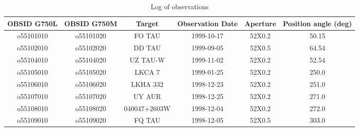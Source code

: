\begin{table*}
\caption{Log of observations\label{tab:obs}}
\begin{center}
\begin{tabular}{cccccc}
\hline\hline
OBSID G750L & OBSID G750M & Target & Observation Date & Aperture & Position angle (deg) \\
\hline
o55101010& o55101020 & FO TAU & 1999-10-17 & 52X0.2 & 50.15 \\


o55102010& o55102020 & DD TAU & 1999-09-05 & 52X0.5 & 64.54 \\


o55104010& o55104020 & UZ TAU-W & 1999-11-02 & 52X0.2 & 52.54 \\


o55105010& o55105020 & LKCA 7 & 1999-01-25 & 52X0.2 & 250.0 \\


o55106010& o55106020 & LKHA 332 & 1998-12-23 & 52X0.2 & 251.0 \\


o55107010& o55107020 & UY AUR & 1998-12-25 & 52X0.2 & 271.0 \\


o55108010& o55108020 & 040047+2603W & 1998-12-04 & 52X0.2 & 272.0 \\


o55109010& o55109020 & FQ TAU & 1998-12-05 & 52X0.5 & 303.0 \\



\end{tabular}
\end{center}
\end{table*}
